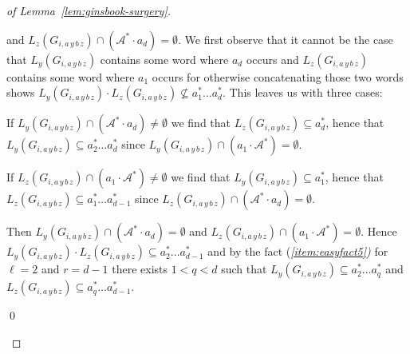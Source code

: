 \documentclass[final]{llncs}
\begin{document}
\begin{proof}[of Lemma~\ref{lem:ginsbook-surgery}]
\begin{compactenum}[1.]
\begin{compactenum}
      and \( L_z(G_{i,a\, y\, b\, z}) \cap (\mathcal{A}^*\cdot a_d) = \emptyset
      \).  We first observe that it cannot be the case that
      \(L_y(G_{i,a\, y\, b\, z})\) contains some word where \(a_d\) occurs and
      \(L_{z}(G_{i,a\, y\, b\, z})\) contains some word where \(a_1\) occurs for
      otherwise concatenating those two words shows \(
      L_y(G_{i,a\, y\, b\, z})\cdot L_z(G_{i,a\, y\, b\, z}) \nsubseteq a_1^* \ldots
      a_d^*\). This leaves us with three cases:
      \begin{inparaenum}
      \item If \(L_y(G_{i,a\, y\, b\, z}) \cap (\mathcal{A}^*\cdot a_d) \neq \emptyset\)
        we find that \(L_z(G_{i,a\, y\, b\, z}) \subseteq a_d^*\), hence that \(
        L_y(G_{i,a\, y\, b\, z}) \subseteq a_2^* \ldots a_{d}^* \) since
        \(L_y(G_{i,a\, y\, b\, z}) \cap (a_1\cdot\mathcal{A}^*)=\emptyset\).
      \item If \(L_z(G_{i,a\, y\, b\, z}) \cap (a_1\cdot \mathcal{A}^*) \neq
        \emptyset\) we find that \(L_y(G_{i,a\, y\, b\, z}) \subseteq a_1^*\),
        hence that \( L_z(G_{i,a\, y\, b\, z}) \subseteq a_1^* \ldots a_{d-1}^*\)
        since \( L_z(G_{i,a\, y\, b\, z}) \cap (\mathcal{A}^*\cdot a_d) =
        \emptyset\).
      \item Then \(L_y(G_{i,a\, y\, b\, z}) \cap (\mathcal{A}^* \cdot a_d ) =
        \emptyset\) and \( L_z(G_{i,a\, y\, b\, z}) \cap (a_1\cdot \mathcal{A}^*)
        = \emptyset\). Hence \( L_y(G_{i,a\, y\, b\, z})\cdot L_z(G_{i,a\, y\, b\, z})
        \subseteq a_2^* \ldots a_{d-1}^*\) and by the fact
				{\upshape(\itshape\ref{item:easyfact5}\upshape)} for \(\ell=2\) and \(r=d-1\) there
        exists \(1 < q < d\) such that \(L_y(G_{i,a\, y\, b\, z}) \subseteq a_2^*
        \ldots a_q^* \) and \(L_z(G_{i,a\, y\, b\, z}) \subseteq a_q^* \ldots
        a_{d-1}^*\).
	\end{inparaenum}\qed
\end{compactenum}
\end{compactenum} 
\end{proof} 
\end{document}

